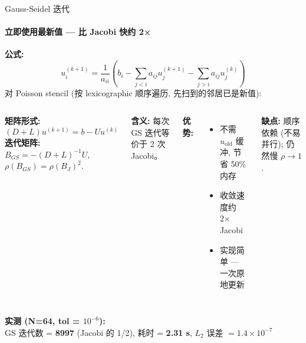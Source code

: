 \documentclass[12pt,aspectratio=169]{beamer}
\begin{document}
\begin{frame}[shrink]{Gauss-Seidel 迭代}
\framesubtitle{立即使用最新值 — 比 Jacobi 快约 2×}

\textbf{公式:}
\[
u_i^{(k+1)} = \frac{1}{a_{ii}}\left(b_i - \sum_{j < i} a_{ij} u_j^{(k+1)} - \sum_{j > i} a_{ij} u_j^{(k)}\right)
\]
对 Poisson stencil (按 lexicographic 顺序遍历, 先扫到的邻居已是新值):

\begin{columns}[T]
\textbf{矩阵形式:}
\[
(D + L) u^{(k+1)} = b - U u^{(k)}
\]
\textbf{迭代矩阵:} $B_{GS} = -(D+L)^{-1} U$, $\rho(B_{GS}) = \rho(B_J)^2$.

\vspace{4pt}
\textbf{含义:} 每次 GS 迭代等价于 2 次 Jacobi。

\textbf{优势:}
\begin{itemize}\itemsep1pt
  \item 不需 $u_{\text{old}}$ 缓冲, 节省 50\% 内存
  \item 收敛速度约 2× Jacobi
  \item 实现简单 — 一次原地更新
\end{itemize}

\vspace{4pt}
\textbf{缺点:} 顺序依赖 (不易并行); 仍然慢 $\rho \to 1$.
\end{columns}

\vspace{6pt}
\textbf{实测 (N=64, tol = $10^{-6}$):} \\
\hspace*{2em} GS 迭代数 = \textbf{8997} (Jacobi 的 1/2), 耗时 = \textbf{2.31 s}, $L_2$ 误差 $= 1.4\times 10^{-7}$
\end{frame}
\end{document}
